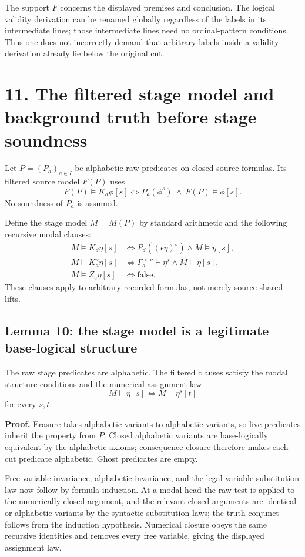 \documentclass[
  11pt,
  letterpaper,
]{article}
\begin{document}
The support \(F\) concerns the displayed premises and conclusion. The
logical validity derivation can be renamed globally regardless of the
labels in its intermediate lines; those intermediate lines need no
ordinal-pattern conditions. Thus one does not incorrectly demand that
arbitrary labels inside a validity derivation already lie below the
original cut.

\section{11. The filtered stage model and background truth before stage
soundness}\label{the-filtered-stage-model-and-background-truth-before-stage-soundness}

Let \(P=(P_a)_{a\in I}\) be alphabetic raw predicates on closed source
formulas. Its filtered source model \(F(P)\) uses \[
F(P)\models K_a\phi[s]
\iff P_a(\phi^s)\ \land\ F(P)\models\phi[s].
\] No soundness of \(P_a\) is assumed.

Define the stage model \(M=M(P)\) by standard arithmetic and the
following recursive modal clauses: \[
\begin{aligned}
M\models K_d\eta[s]
&\iff P_d((\epsilon\eta)^s)\land M\models\eta[s],\\
M\models K_a^\nu\eta[s]
&\iff \Gamma_a^{<\nu}\vdash\eta^s\land M\models\eta[s],\\
M\models Z_e\eta[s]&\iff\text{false}.
\end{aligned}
\tag{3}
\] These clauses apply to arbitrary recorded formulas, not merely
source-shared lifts.

\subsection{Lemma 10: the stage model is a legitimate base-logical
structure}\label{lemma-10-the-stage-model-is-a-legitimate-base-logical-structure}

The raw stage predicates are alphabetic. The filtered clauses satisfy
the modal structure conditions and the numerical-assignment law \[
M\models\eta[s]\iff M\models\eta^s[t]
\] for every \(s,t\).

\textbf{Proof.} Erasure takes alphabetic variants to alphabetic
variants, so live predicates inherit the property from \(P\). Closed
alphabetic variants are base-logically equivalent by the alphabetic
axioms; consequence closure therefore makes each cut predicate
alphabetic. Ghost predicates are empty.

Free-variable invariance, alphabetic invariance, and the legal
variable-substitution law now follow by formula induction. At a modal
head the raw test is applied to the numerically closed argument, and the
relevant closed arguments are identical or alphabetic variants by the
syntactic substitution laws; the truth conjunct follows from the
induction hypothesis. Numerical closure obeys the same recursive
identities and removes every free variable, giving the displayed
assignment law.
\end{document}
